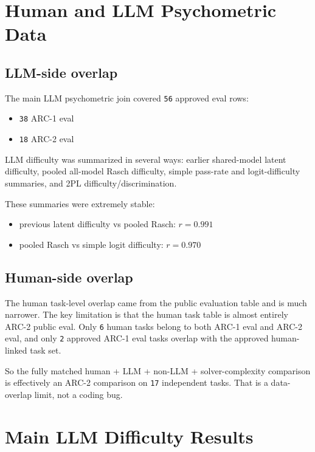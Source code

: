\documentclass[11pt]{article}
\begin{document}
\section*{Human and LLM Psychometric Data}

\subsection*{LLM-side overlap}

The main LLM psychometric join covered \texttt{56} approved eval rows:

\begin{itemize}
  \item \texttt{38} ARC-1 eval
  \item \texttt{18} ARC-2 eval
\end{itemize}

LLM difficulty was summarized in several ways: earlier shared-model latent difficulty, pooled all-model Rasch difficulty, simple pass-rate and logit-difficulty summaries, and 2PL difficulty/discrimination.

These summaries were extremely stable:

\begin{itemize}
  \item previous latent difficulty vs pooled Rasch: $r = 0.991$
  \item pooled Rasch vs simple logit difficulty: $r = 0.970$
\end{itemize}

\subsection*{Human-side overlap}

The human task-level overlap came from the public evaluation table and is much narrower. The key limitation is that the human task table is almost entirely ARC-2 public eval. Only \texttt{6} human tasks belong to both ARC-1 eval and ARC-2 eval, and only \texttt{2} approved ARC-1 eval tasks overlap with the approved human-linked task set.

So the fully matched human + LLM + non-LLM + solver-complexity comparison is effectively an ARC-2 comparison on \texttt{17} independent tasks. That is a data-overlap limit, not a coding bug.

\section*{Main LLM Difficulty Results}
\end{document}
